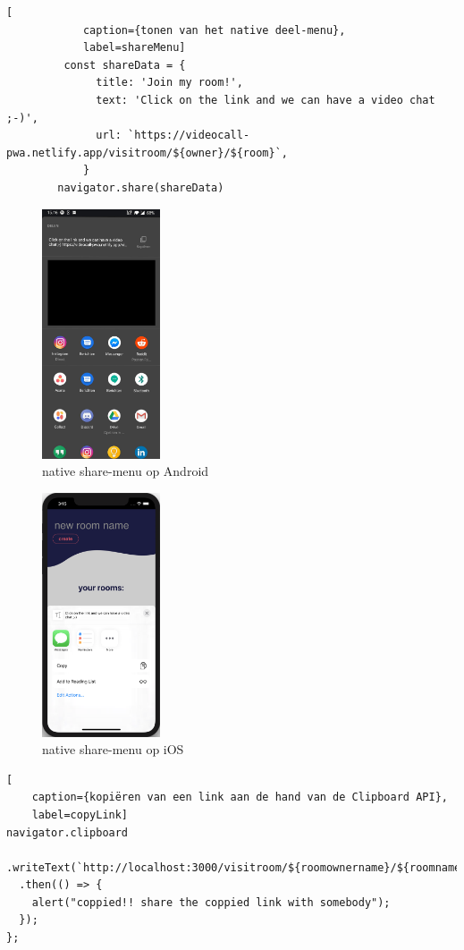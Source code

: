 		\begin{lstlisting}[
			caption={tonen van het native deel-menu},
			label=shareMenu]
		 const shareData = {
		      title: 'Join my room!',
		      text: 'Click on the link and we can have a video chat ;-)',
		      url: `https://videocall-pwa.netlify.app/visitroom/${owner}/${room}`,
		    }
		navigator.share(shareData)
		\end{lstlisting}
				\begin{figure}[H]
					\centering
					\includegraphics[width=35mm]{./img/share-android.jpg}{}
					\caption{native share-menu op Android}
					\label{fig:shareChrome}
				\end{figure}
				\begin{figure}[H]
					\centering
					\includegraphics[width=35mm]{./img/share-iOS}{}
					\caption{native share-menu op iOS}
					\label{fig:shareIOS}
				\end{figure}	

\begin{lstlisting}[
	caption={kopiëren van een link aan de hand van de Clipboard API},
	label=copyLink]
navigator.clipboard
  .writeText(`http://localhost:3000/visitroom/${roomownername}/${roomname}`)
  .then(() => {
    alert("coppied!! share the coppied link with somebody");
  });
};
\end{lstlisting}


